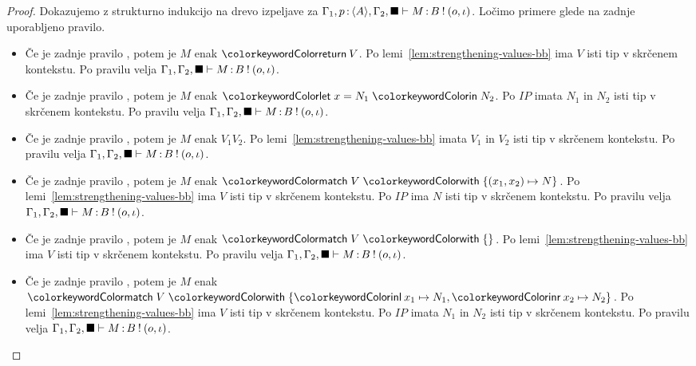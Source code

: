 \begin{proof}
	Dokazujemo z strukturno indukcijo na drevo izpeljave za $\Gamma_1, p \mathinner{:} \langle A \rangle, \Gamma_2, \blacksquare \vdash M \mathinner{:} B \mathbin{!} (o, \iota)$.
	Ločimo primere glede na zadnje uporabljeno pravilo.
	
	\begin{itemize}
		\item Če je zadnje pravilo , potem je $M$ enak $\tmreturn{V}$.
		Po lemi~\ref{lem:strengthening-values-bb} ima $V$ isti tip v skrčenem kontekstu.
		Po pravilu  velja $\Gamma_1, \Gamma_2, \blacksquare \vdash M \mathinner{:} B \mathbin{!} (o, \iota)$.
		
		\item Če je zadnje pravilo , potem je $M$ enak $\tmlet{x}{N_1}{N_2}$.
		Po $IP$ imata $N_1$ in $N_2$ isti tip v skrčenem kontekstu.
		Po pravilu  velja $\Gamma_1, \Gamma_2, \blacksquare \vdash M \mathinner{:} B \mathbin{!} (o, \iota)$.
		
		\item Če je zadnje pravilo , potem je $M$ enak $V_1 V_2$.
		Po lemi~\ref{lem:strengthening-values-bb} imata $V_1$ in $V_2$ isti tip v skrčenem kontekstu.
		Po pravilu  velja $\Gamma_1, \Gamma_2, \blacksquare \vdash M \mathinner{:} B \mathbin{!} (o, \iota)$.
		
		\item Če je zadnje pravilo , potem je $M$ enak $\tmmatch{V}{(x_1,x_2) \mapsto N}$. 
		Po lemi~\ref{lem:strengthening-values-bb} ima $V$ isti tip v skrčenem kontekstu.
		Po $IP$ ima $N$ isti tip v skrčenem kontekstu.
		Po pravilu  velja $\Gamma_1, \Gamma_2, \blacksquare \vdash M \mathinner{:} B \mathbin{!} (o, \iota)$.
		
		\item Če je zadnje pravilo , potem je $M$ enak $\tmmatch{V}{}$.
		Po lemi~\ref{lem:strengthening-values-bb} ima $V$ isti tip v skrčenem kontekstu.
		Po pravilu  velja $\Gamma_1, \Gamma_2, \blacksquare \vdash M \mathinner{:} B \mathbin{!} (o, \iota)$.
		
		\item Če je zadnje pravilo , potem je $M$ enak $\tmmatch{V}{\tminl{x_1} \mapsto N_1, \tminr{x_2} \mapsto N_2}$.
		Po lemi~\ref{lem:strengthening-values-bb} ima $V$ isti tip v skrčenem kontekstu.
		Po $IP$ imata $N_1$ in $N_2$ isti tip v skrčenem kontekstu.
		Po pravilu  velja $\Gamma_1, \Gamma_2, \blacksquare \vdash M \mathinner{:} B \mathbin{!} (o, \iota)$.
		

\end{itemize}
\end{proof}
